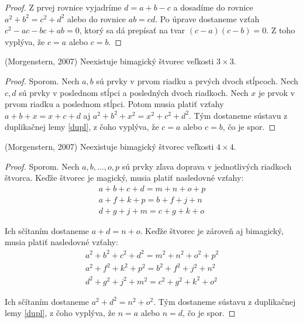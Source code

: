 \begin{proof} Z prvej rovnice vyjadríme $d = a + b - c$ a dosadíme do rovnice $a^2 + b^2 = c^2 + d^2$ alebo do rovnice $ab = cd$. Po úprave dostaneme vzťah $c^2 - ac - bc + ab = 0$, ktorý sa dá prepísať na tvar $(c - a)(c - b) = 0$. Z toho vyplýva, že $c = a$ alebo $c = b$.
\end{proof} 

\begin{theorem} (Morgenstern, 2007) Neexistuje bimagický štvorec veľkosti $3 \times 3$.
\end{theorem}

\begin{proof} Sporom. Nech $a,b$ sú prvky v prvom riadku a prvých dvoch stĺpcoch. Nech $c,d$ sú prvky v poslednom stĺpci a posledných dvoch riadkoch. Nech $x$ je prvok v prvom riadku a poslednom stĺpci. Potom musia platiť vzťahy $a + b + x = x + c + d$ aj $a^2 + b^2 + x^2 = x^2 + c^2 + d^2$. Tým dostaneme sústavu z duplikačnej lemy \ref{dupl}, z čoho vyplýva, že $c = a$ alebo $c = b$, čo je spor.
\end{proof} 

\begin{theorem} (Morgenstern, 2007) Neexistuje bimagický štvorec veľkosti $4 \times 4$.
\end{theorem}

\begin{proof} Sporom. Nech $a, b, \dots , o, p$ sú prvky zľava doprava v jednotlivých riadkoch štvorca. Keďže štvorec je magický, musia platiť nasledovné vzťahy:
\begin{gather*}
a + b + c + d = m + n + o + p \\
a + f + k + p = b + f + j + n \\
d + g + j + m = c + g + k + o
\end{gather*}

Ich sčítaním dostaneme $a + d = n + o$. Keďže štvorec je zároveň aj bimagický, musia platiť nasledovné vzťahy:
\begin{gather*}
a^2 + b^2 + c^2 + d^2 = m^2 + n^2 + o^2 + p^2 \\
a^2 + f^2 + k^2 + p^2 = b^2 + f^2 + j^2 + n^2 \\
d^2 + g^2 + j^2 + m^2 = c^2 + g^2 + k^2 + o^2
\end{gather*}

Ich sčítaním dostaneme $a^2 + d^2 = n^2 + o^2$. Tým dostaneme sústavu z duplikačnej lemy \ref{dupl}, z čoho vyplýva, že $n = a$ alebo $n = d$, čo je spor.
\end{proof} 

